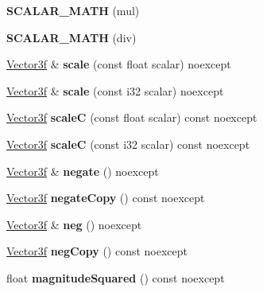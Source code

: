 \begin{DoxyCompactItemize}
{\bfseries S\+C\+A\+L\+A\+R\+\_\+\+M\+A\+TH} (mul)
\item 
\mbox{\label{class_vector3f_a0ada95ece11bb564008c953b5be2a184}} 
{\bfseries S\+C\+A\+L\+A\+R\+\_\+\+M\+A\+TH} (div)
\item 
\mbox{\label{class_vector3f_a980ace62ba0cd3fb1c9ce3da2f66ffa6}} 
\mbox{\hyperlink{class_vector3f}{Vector3f}} \& {\bfseries scale} (const float scalar) noexcept
\item 
\mbox{\label{class_vector3f_a38d4146c614cf58391833357049b12ab}} 
\mbox{\hyperlink{class_vector3f}{Vector3f}} \& {\bfseries scale} (const i32 scalar) noexcept
\item 
\mbox{\label{class_vector3f_a332ae913d390617d745358e9adc3207a}} 
\mbox{\hyperlink{class_vector3f}{Vector3f}} {\bfseries scaleC} (const float scalar) const noexcept
\item 
\mbox{\label{class_vector3f_a27b81e2719d74e97a1e76d5f8cf2d72f}} 
\mbox{\hyperlink{class_vector3f}{Vector3f}} {\bfseries scaleC} (const i32 scalar) const noexcept
\item 
\mbox{\label{class_vector3f_a8e74365d4f74663c7a6457feb9c53387}} 
\mbox{\hyperlink{class_vector3f}{Vector3f}} \& {\bfseries negate} () noexcept
\item 
\mbox{\label{class_vector3f_a31dd164efbe43832619fcf8415272bd5}} 
\mbox{\hyperlink{class_vector3f}{Vector3f}} {\bfseries negate\+Copy} () const noexcept
\item 
\mbox{\label{class_vector3f_a8644088d07ec066c795fc565dcdb29e8}} 
\mbox{\hyperlink{class_vector3f}{Vector3f}} \& {\bfseries neg} () noexcept
\item 
\mbox{\label{class_vector3f_a4132ae254a350ee1165b71c01742c728}} 
\mbox{\hyperlink{class_vector3f}{Vector3f}} {\bfseries neg\+Copy} () const noexcept
\item 
\mbox{\label{class_vector3f_a035fae5d2e8e73a5e8ca16a91d4ebd24}} 
float {\bfseries magnitude\+Squared} () const noexcept

\end{DoxyCompactItemize}

